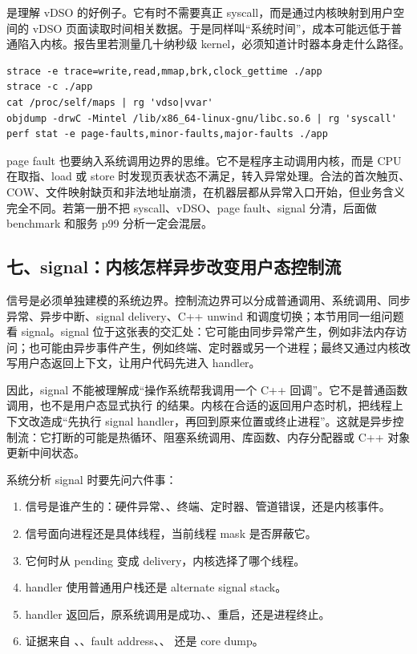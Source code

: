  是理解 vDSO 的好例子。它有时不需要真正 syscall，而是通过内核映射到用户空间的 vDSO 页面读取时间相关数据。于是同样叫“系统时间”，成本可能远低于普通陷入内核。报告里若测量几十纳秒级 kernel，必须知道计时器本身走什么路径。

\begin{lstlisting}[numbers=none,caption={系统边界证据包}]
strace -e trace=write,read,mmap,brk,clock_gettime ./app
strace -c ./app
cat /proc/self/maps | rg 'vdso|vvar'
objdump -drwC -Mintel /lib/x86_64-linux-gnu/libc.so.6 | rg 'syscall'
perf stat -e page-faults,minor-faults,major-faults ./app
\end{lstlisting}

page fault 也要纳入系统调用边界的思维。它不是程序主动调用内核，而是 CPU 在取指、load 或 store 时发现页表状态不满足，转入异常处理。合法的首次触页、COW、文件映射缺页和非法地址崩溃，在机器层都从异常入口开始，但业务含义完全不同。若第一册不把 syscall、vDSO、page fault、signal 分清，后面做 benchmark 和服务 p99 分析一定会混层。

\subsection{七、signal：内核怎样异步改变用户态控制流}

信号是必须单独建模的系统边界。控制流边界可以分成普通调用、系统调用、同步异常、异步中断、signal delivery、C++ unwind 和调度切换；本节用同一组问题看 signal。signal 位于这张表的交汇处：它可能由同步异常产生，例如非法内存访问；也可能由异步事件产生，例如终端、定时器或另一个进程；最终又通过内核改写用户态返回上下文，让用户代码先进入 handler。

因此，signal 不能被理解成“操作系统帮我调用一个 C++ 回调”。它不是普通函数调用，也不是用户态显式执行  的结果。内核在合适的返回用户态时机，把线程上下文改造成“先执行 signal handler，再回到原来位置或终止进程”。这就是异步控制流：它打断的可能是热循环、阻塞系统调用、库函数、内存分配器或 C++ 对象更新中间状态。

系统分析 signal 时要先问六件事：

\begin{enumerate}
  \item 信号是谁产生的：硬件异常、、终端、定时器、管道错误，还是内核事件。
  \item 信号面向进程还是具体线程，当前线程 mask 是否屏蔽它。
  \item 它何时从 pending 变成 delivery，内核选择了哪个线程。
  \item handler 使用普通用户栈还是 alternate signal stack。
  \item handler 返回后，原系统调用是成功、、重启，还是进程终止。
  \item 证据来自 、、fault address、、 还是 core dump。
\end{enumerate}

